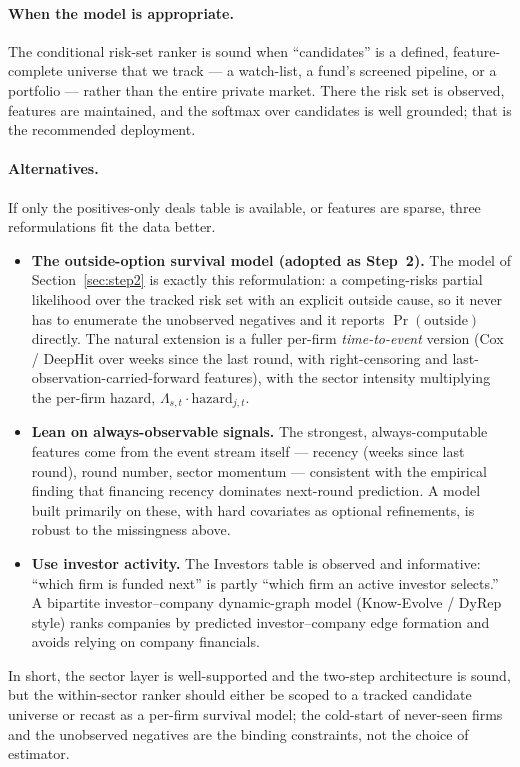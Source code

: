 \documentclass[11pt]{article}
\begin{document}
\paragraph{When the model is appropriate.} The conditional risk-set ranker is sound when
``candidates'' is a defined, feature-complete universe that we track --- a watch-list, a
fund's screened pipeline, or a portfolio --- rather than the entire private market. There
the risk set is observed, features are maintained, and the softmax over candidates is well
grounded; that is the recommended deployment.

\paragraph{Alternatives.} If only the positives-only deals table is available, or features
are sparse, three reformulations fit the data better.
\begin{itemize}[leftmargin=1.4em,itemsep=2pt]
\item \textbf{The outside-option survival model (adopted as Step~2).} The model of
Section~\ref{sec:step2} is exactly this reformulation: a competing-risks partial
likelihood over the tracked risk set with an explicit outside cause, so it never has to
enumerate the unobserved negatives and it reports $\Pr(\text{outside})$ directly. The
natural extension is a fuller per-firm \emph{time-to-event} version (Cox / DeepHit over
weeks since the last round, with right-censoring and last-observation-carried-forward
features), with the sector intensity multiplying the per-firm hazard,
$\Lambda_{s,t}\cdot\mathrm{hazard}_{j,t}$.
\item \textbf{Lean on always-observable signals.} The strongest, always-computable
features come from the event stream itself --- recency (weeks since last round), round
number, sector momentum --- consistent with the empirical finding that financing recency
dominates next-round prediction. A model built primarily on these, with hard covariates as
optional refinements, is robust to the missingness above.
\item \textbf{Use investor activity.} The Investors table is observed and informative:
``which firm is funded next'' is partly ``which firm an active investor selects.'' A
bipartite investor--company dynamic-graph model (Know-Evolve / DyRep style) ranks companies
by predicted investor--company edge formation and avoids relying on company financials.
\end{itemize}
In short, the sector layer is well-supported and the two-step architecture is sound, but
the within-sector ranker should either be scoped to a tracked candidate universe or recast
as a per-firm survival model; the cold-start of never-seen firms and the unobserved
negatives are the binding constraints, not the choice of estimator.
\end{document}
